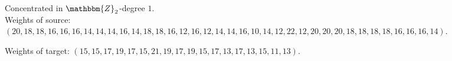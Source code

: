 \documentclass[12pt]{scrartcl}
\newcommand{\Z}{\mathbbm{Z}}
\begin{document}
{Concentrated in $\Z_{2}$-degree $  1  $.\\

Weights of source: $ (20,18,18,16,16,16,14,14,14,16,14,18,18,16,12,16,12,14,14,16,10,14,12,22,12,20,20,20,18,18,18,18,16,16,16,14) $.

Weights of target:
$ (15,15,17,19,17,15,21,19,17,19,15,17,13,17,13,15,11,13) $.
}
\end{document}
